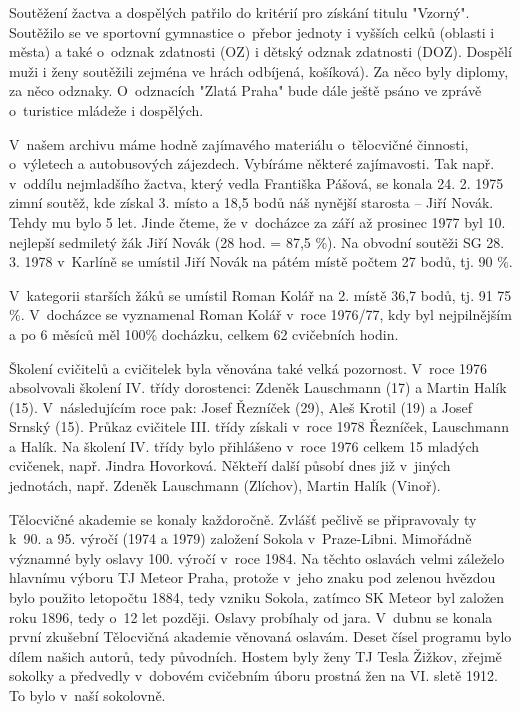 \documentclass[a5paper, 12pt, twoside]{article}
\begin{document}
Soutěžení žactva a dospělých patřilo do kritérií pro získání titulu
"Vzorný". Soutěžilo se ve sportovní gymnastice o~přebor jednoty i
vyšších celků (oblasti i města) a také o~odznak zdatnosti (OZ) i dětský
odznak zdatnosti (DOZ). Dospělí muži i ženy soutěžili zejména ve hrách
odbíjená, košíková). Za něco byly diplomy, za něco odznaky. O~odznacích
"Zlatá Praha" bude dále ještě psáno ve zprávě o~turistice mládeže i
dospělých.

V~našem archivu máme hodně zajímavého materiálu o~tělocvičné činnosti,
o~výletech a autobusových zájezdech. Vybíráme některé zajímavosti. Tak
např. v~oddílu nejmladšího žactva, který vedla Františka Pášová, se
konala 24. 2. 1975 zimní soutěž, kde získal 3. místo a 18,5 bodů náš
nynější starosta -- Jiří Novák. Tehdy mu bylo 5 let. Jinde čteme, že
v~docházce za září až prosinec 1977 byl 10. nejlepší sedmiletý žák Jiří
Novák (28 hod. = 87,5 \%). Na obvodní soutěži SG 28. 3. 1978 v~Karlíně
se umístil Jiří Novák na pátém místě počtem 27 bodů, tj. 90 \%.

V~kategorii starších žáků se umístil Roman Kolář na 2. místě 36,7 bodů,
tj. 91 75 \%. V~docházce se vyznamenal Roman Kolář v~roce 1976/77, kdy
byl nejpilnějším a po 6 měsíců měl 100\% docházku, celkem 62 cvičebních
hodin.

Školení cvičitelů a cvičitelek byla věnována také velká pozornost.
V~roce 1976 absolvovali školení IV. třídy dorostenci: Zdeněk Lauschmann
(17) a Martin Halík (15). V~následujícím roce pak: Josef Řezníček (29),
Aleš Krotil (19) a Josef Srnský (15). Průkaz cvičitele III. třídy
získali v~roce 1978 Řezníček, Lauschmann a Halík. Na školení IV. třídy
bylo přihlášeno v~roce 1976 celkem 15 mladých cvičenek, např. Jindra
Hovorková. Někteří další působí dnes již v~jiných jednotách, např.
Zdeněk Lauschmann (Zlíchov), Martin Halík (Vinoř).

Tělocvičné akademie se konaly každoročně. Zvlášť pečlivě se připravovaly
ty k~90. a 95. výročí (1974 a 1979) založení Sokola v~Praze-Libni.
Mimořádně významné byly oslavy 100. výročí v~roce 1984. Na těchto
oslavách velmi záleželo hlavnímu výboru TJ Meteor Praha, protože v~jeho
znaku pod zelenou hvězdou bylo použito letopočtu 1884, tedy vzniku
Sokola, zatímco SK Meteor byl založen roku 1896, tedy o~12 let později.
Oslavy probíhaly od jara. V~dubnu se konala první zkušební Tělocvičná
akademie věnovaná oslavám. Deset čísel programu bylo dílem našich
autorů, tedy původních. Hostem byly ženy TJ Tesla Žižkov, zřejmě sokolky
a předvedly v~dobovém cvičebním úboru prostná žen na VI. sletě 1912. To
bylo v~naší sokolovně.
\end{document}
